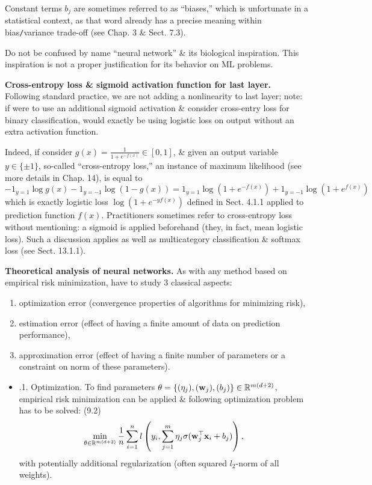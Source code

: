 \documentclass{article}
\begin{document}
\begin{enumerate}
\begin{itemize}
\begin{itemize}
			Constant terms $b_j$ are sometimes referred to as ``biases,'' which is unfortunate in a statistical context, as that word already has a precise meaning within bias{\tt/}variance trade-off (see Chap. 3 \& Sect. 7.3).
			
			Do not be confused by name ``neural network'' \& its biological inspiration. This inspiration is not a proper justification for its behavior on ML problems.
			
			{\bf Cross-entropy loss \& sigmoid activation function for last layer.} Following standard practice, we are not adding a nonlinearity to last layer; note: if were to use an additional sigmoid activation \& consider cross-entry loss for binary classification, would exactly be using logistic loss on output without an extra activation function.
			
			Indeed, if consider $g(x) = \frac{1}{1 + e^{-f(x)}}\in[0,1]$, \& given an output variable $y\in\{\pm1\}$, so-called ``cross-entropy loss,'' an instance of maximum likelihood (see more details in Chap. 14), is equal to
			\begin{equation}
				-1_{y=1}\log g(x) - 1_{y=-1}\log(1 - g(x)) = 1_{y=1}\log(1 + e^{-f(x)}) + 1_{y=-1}\log(1 + e^{f(x)})
			\end{equation}
			which is exactly logistic loss $\log(1 + e^{-yf(x)})$ defined in Sect. 4.1.1 applied to prediction function $f(x)$. Practitioners sometimes refer to cross-entropy loss without mentioning: a sigmoid is applied beforehand (they, in fact, mean logistic loss). Such a discussion applies as well as multicategory classification \& softmax loss (see Sect. 13.1.1).
			
			{\bf Theoretical analysis of neural networks.} As with any method based on empirical risk minimization, have to study 3 classical aspects:
			\begin{enumerate}
				\item optimization error (convergence properties of algorithms for minimizing risk),
				\item estimation error (effect of having a finite amount of data on prediction performance),
				\item approximation error (effect of having a finite number of parameters or a constraint on norm of these parameters).
			\end{enumerate}
						
			\begin{itemize}
				\item {.1. Optimization.} To find parameters $\theta = \{(\eta_j),({\bf w}_j),(b_j)\}\in\mathbb{R}^{m(d + 2)}$, empirical risk minimization can be applied \& following optimization problem has to be solved: (9.2)
				\begin{equation}
					\min_{\theta\in\mathbb{R}^{m(d + 2)}} \frac{1}{n}\sum_{i=1}^n l\left(y_i,\sum_{j=1}^m \eta_j\sigma({\bf w}_j^\top{\bf x}_i + b_j)\right),
				\end{equation}
				with potentially additional regularization (often squared $l_2$-norm of all weights).
				

\end{itemize}
\end{itemize}
\end{itemize}
\end{enumerate}
\end{document}
